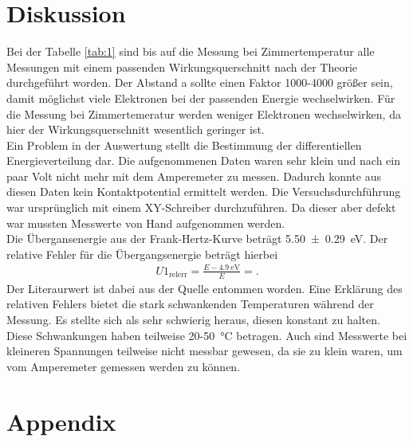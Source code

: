 \section{Diskussion}
Bei der Tabelle \ref{tab:1} sind bis auf die Messung bei Zimmertemperatur alle
Messungen mit einem passenden Wirkungsquerschnitt nach der Theorie durchgeführt worden.
Der Abstand a sollte einen Faktor 1000-4000 größer sein, damit möglichst viele Elektronen
bei der passenden Energie wechselwirken. Für die Messung bei Zimmertemeratur werden
weniger Elektronen wechselwirken, da hier der Wirkungsquerschnitt wesentlich geringer ist.\\
Ein Problem in der Auswertung stellt die Bestimmung der differentiellen Energieverteilung dar.
Die aufgenommenen Daten waren sehr klein und nach ein paar Volt nicht mehr mit dem 
Amperemeter zu messen. Dadurch konnte aus diesen Daten kein Kontaktpotential ermittelt werden.
Die Versuchsdurchführung war ursprünglich mit einem XY-Schreiber durchzuführen.
Da dieser aber defekt war mussten Messwerte von Hand aufgenommen werden. \\
Die Übergansenergie aus der Frank-Hertz-Kurve beträgt \SI{5.50+-0.29}{\electronvolt}.
Der relative Fehler für die Übergangsenergie beträgt hierbei
\begin{align}
    U1_{\text{relerr}} = \frac{E-\SI{4.9}{\electronvolt}}{E} =\text{}. \label{eq:10} 
\end{align}
Der Literaurwert ist dabei aus der Quelle \cite{linsen200926} entommen worden.
Eine Erklärung des relativen Fehlers bietet die stark schwankenden Temperaturen
während der Messung. Es stellte sich als sehr schwierig heraus, diesen konstant zu halten.
Diese Schwankungen haben teilweise 20-\SI{50}{\celsius} betragen. Auch sind Messwerte bei kleineren
Spannungen teilweise nicht messbar gewesen, da sie zu klein waren, um vom Amperemeter 
gemessen werden zu können.



\newpage
\printbibliography
\newpage
\section*{Appendix}



